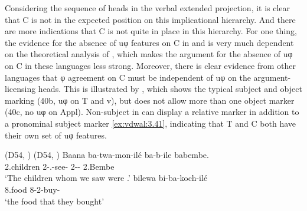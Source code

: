 \documentclass[output=paper]{langsci/langscibook}
\begin{document}
Considering the sequence of heads in the verbal extended projection, it is
clear that C is not in the expected position on this implicational hierarchy.
And there are more indications that C is not quite in place in this hierarchy.
For one thing, the evidence for the absence of uφ features on C in  and
 is very much dependent on the theoretical analysis of ,
which makes the argument for the absence of uφ on C in these languages less
strong. Moreover, there is clear evidence from other  languages that φ
agreement on C must be independent of uφ on the argument-licensing heads. This
is illustrated by , which shows the typical  subject and object
marking (40b, uφ on T and v), but does not allow more than one object marker
(40c, no uφ on Appl). Non-subject  in  can display a
relative marker in addition to a pronominal subject marker \eqref{ex:vdwal:3.41},
indicating that T and C both have their own set of uφ features.

\ea\label{ex:vdwal:3.39}  (D54, \citealt[103]{Iorio2014}) \label{bkm:Ref298742208}
	\z
\ex \label{ex:vdwal:3.40}  (D54, \citealt[152]{Iorio2014}) \label{bkm:Ref347515914}
	\ea\label{ex:vdwal:3.40a}
	\gll	 Baana  ba-twa-mon-ilé  ba-b-ile  babembe.\\
	    2.children  2\Rm{}-\Fpl.\Sm{}-see-\Pst{}  2\Sm-\Cop-\Pst{}  2.Bembe\\
	\glt    ‘The children whom we saw were .’
	\ex\label{ex:vdwal:3.40b}
	\gll	 bilewa  bi-ba-koch-ilé\\
	    8.food  8\Rm{}-2\Sm{}-buy-\Pst{}\\
	\glt    ‘the food that they bought’
	\z
\z
\end{document}
